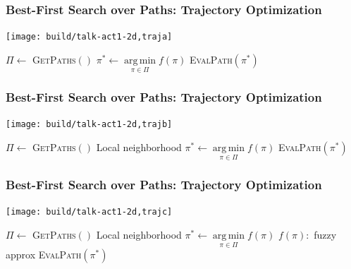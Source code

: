 \documentclass[serif]{beamer}
\DeclareMathOperator*{\argmin}{arg\,min}
\begin{document}
\begin{frame}
   \frametitle{Best-First Search over Paths: Trajectory Optimization}
   \begin{center}
      \texttt{[image: build/talk-act1-2d,traja]}
      
      \begin{minipage}{0.65\textwidth}
      \begin{algorithmic}
      \Loop
         \State $\Pi \leftarrow $ \textsc{GetPaths}$()$
            \Comment {}
         \State $\pi^* \leftarrow \argmin\limits_{\pi \in \Pi} f(\pi)$
            \Comment {}
         \State \textsc{EvalPath}$(\pi^*)$
            \Comment {}
      \EndLoop
      \end{algorithmic}
      \end{minipage}
   \end{center}
\end{frame}

\begin{frame}
   \frametitle{Best-First Search over Paths: Trajectory Optimization}
   \begin{center}
      \texttt{[image: build/talk-act1-2d,trajb]}
      
      \begin{minipage}{0.8\textwidth}
      \begin{algorithmic}
      \Loop
         \State $\Pi \leftarrow $ \textsc{GetPaths}$()$
            \Comment Local neighborhood
         \State $\pi^* \leftarrow \argmin\limits_{\pi \in \Pi} f(\pi)$
            \Comment {}
         \State \textsc{EvalPath}$(\pi^*)$
            \Comment {}
      \EndLoop
      \end{algorithmic}
      \end{minipage}
   \end{center}
\end{frame}

\begin{frame}
   \frametitle{Best-First Search over Paths: Trajectory Optimization}
   \begin{center}
      \texttt{[image: build/talk-act1-2d,trajc]}
      
      \begin{minipage}{0.8\textwidth}
      \begin{algorithmic}
      \Loop
         \State $\Pi \leftarrow $ \textsc{GetPaths}$()$
            \Comment Local neighborhood
         \State $\pi^* \leftarrow \argmin\limits_{\pi \in \Pi} f(\pi)$
            \Comment $f(\pi):$ fuzzy approx
         \State \textsc{EvalPath}$(\pi^*)$
            \Comment {}
      \EndLoop
      \end{algorithmic}
      \end{minipage}
   \end{center}
\end{frame}
\end{document}

